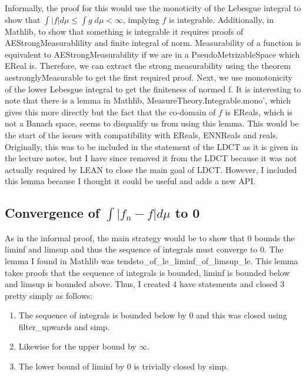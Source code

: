 \documentclass{article}
\renewcommand{\texttt}[1]{{\small\ttfamily #1}}
\begin{document}
Informally, the proof for this would use the monoticity of the Lebesgue integral to show that \(\int |f|d\mu \le \int g \;d\mu <\infty\), implying \(f\) is integrable. Additionally, in Mathlib, to show that something is integrable it requires proofs of AEStrongMeasurablility and finite integral of norm. Measurability of a function is equivalent to AEStrongMeasurability if we are in a PseudoMetrizableSpace which EReal is. Therefore, we can extract the strong measurability using the theorem \texttt{aestronglyMeasurable} to get the first required proof. Next, we use monotonicity of the lower Lebesgue integral to get the finiteness of normed f. It is interesting to note that there is a lemma in Mathlib, \texttt{MeasureTheory.Integrable.mono'}, which gives this more directly but the fact that the co-domain of \(f\) is \texttt{EReals}, which is not a Banach space, seems to disqualify us from using this lemma. This would be the start of the issues with compatibility with \texttt{EReals}, \texttt{ENNReals} and reals. Originally, this was to be included in the statement of the LDCT as it is given in the lecture notes, but I have since removed it from the LDCT because it was not actually required by LEAN to close the main goal of LDCT. However, I included this lemma because I thought it could be useful and adds a new API.

\subsection*{Convergence of \(\int |f_n-f|d\mu\) to 0}

As in the informal proof, the main strategy would be to show that 0 bounds the liminf and limsup and thus the sequence of integrals must converge to 0. The lemma I found in Mathlib was \texttt{tendsto\_of\_le\_liminf\_of\_limsup\_le}. This lemma takes proofs that the sequence of integrals is bounded, liminf is bounded below and limsup is bounded above. Thus, I created 4 \texttt{have} statements and closed 3 pretty simply as follows:

\begin{enumerate}
    \item The sequence of integrals is bounded below by 0 and this was closed using \texttt{filter\_upwards} and \texttt{simp}.
    \item Likewise for the upper bound by \(\infty\).
    \item The lower bound of liminf by 0 is trivially closed by \texttt{simp}.
\end{enumerate}
\end{document}
